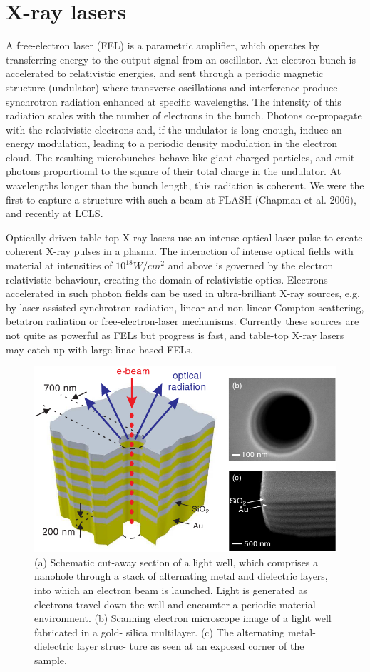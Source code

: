 \section{X-ray lasers}
 
A free-electron laser (FEL) is a parametric amplifier, which operates by
transferring energy to the output signal from an oscillator. An electron bunch
is accelerated to relativistic energies, and sent through a periodic magnetic
structure (undulator) where transverse oscillations and interference produce
synchrotron radiation enhanced at specific wavelengths. The intensity of this
radiation scales with the number of electrons in the bunch. Photons co-propagate
with the relativistic electrons and, if the undulator is long enough, induce an
energy modulation, leading to a periodic density modulation in the electron
cloud. The resulting microbunches behave like giant charged particles, and emit
photons proportional to the square of their total charge in the undulator. At
wavelengths longer than the bunch length, this radiation is coherent. We were
the first to capture a structure with such a beam at FLASH (Chapman et
al. 2006), and recently at LCLS.



Optically driven table-top X-ray lasers use an intense optical laser pulse to
create coherent X-ray pulses in a plasma. The interaction of intense optical
fields with material at intensities of $10^{18} W/cm^2$ and above is governed by the
electron relativistic behaviour, creating the domain of relativistic
optics. Electrons accelerated in such photon fields can be used in
ultra-brilliant X-ray sources, e.g. by laser-assisted synchrotron radiation,
linear and non-linear Compton scattering, betatron radiation or
free-electron-laser mechanisms. 
Currently these sources are not quite as powerful as FELs but
progress is fast, and table-top X-ray lasers may catch up with large linac-based
FELs. 

\begin{figure}[h]
\centering
  \includegraphics[width=0.6 \columnwidth]{FEL_on_a_chip.png}
  \caption{(a) Schematic cut-away section of a light
well, which comprises a nanohole through a stack of alternating
metal and dielectric layers, into which an electron beam is
launched. Light is generated as electrons travel down the well
and encounter a periodic material environment. (b) Scanning
electron microscope image of a light well fabricated in a gold-
silica multilayer. (c) The alternating metal-dielectric layer struc-
ture as seen at an exposed corner of the sample. \cite{Adamo09 PRL}
}
\label{Fig:FEL_Chip}
\end{figure} 

